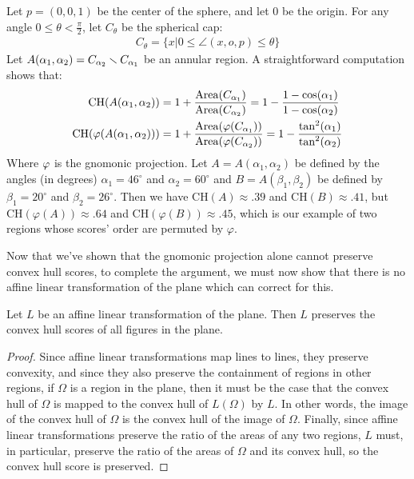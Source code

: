 \begin{example}
  Let $p = (0,0,1)$ be the center of the sphere, and let $0$ be the
  origin. For any angle $0\le \theta< \frac\pi2$, let $C_\theta$ be
  the spherical cap:
  \begin{align*}
    C_{\theta} = \{x|0\le\angle(x,o,p)\le \theta\}
  \end{align*}
  Let $A(\alpha_1,\alpha_2) = C_{\alpha_2}\smallsetminus C_{\alpha_1}$ be 
  an annular region. A straightforward computation shows that:
  \begin{align*}
    \mathrm{CH}(A(\alpha_1,\alpha_2)) &= 
    1+\frac{\mathrm{Area}(C_{\alpha_1})}{\mathrm{Area}(C_{\alpha_2})}
    =1- \frac{1-\cos(\alpha_1)}{1-\cos(\alpha_2)}\\
    \mathrm{CH}(\vphi(A(\alpha_1,\alpha_2))) &=
    1+\frac{\mathrm{Area}(\vphi(C_{\alpha_1}))}%
    {\mathrm{Area}(\vphi(C_{\alpha_2}))}
      =1- \frac{\tan^2(\alpha_1)}{\tan^2(\alpha_2)}
  \end{align*}
  Where $\varphi$ is the gnomonic projection. 
  Let $A=A(\alpha_1,\alpha_2)$ be defined by the angles 
  (in degrees) $\alpha_1=46^\circ$ and
  $\alpha_2=60^\circ$ and $B=A(\beta_1,\beta_2)$ be defined by 
  $\beta_1=20^\circ$ and $\beta_2=26^\circ$. 
  Then we have $\mathrm{CH}(A)\approx .39$ and
  $\mathrm{CH}(B)\approx .41$, but $\mathrm{CH}(\varphi(A))\approx .64$
  and $\mathrm{CH}(\varphi(B))\approx .45$, which is our example of two
  regions whose scores' order are permuted by $\varphi$.
\end{example}
Now that we've shown that the gnomonic projection alone cannot
preserve convex hull scores, to complete the argument, we must now
show that there is no affine linear transformation of the plane which
can correct for this.

\begin{lemma}\label{lem:noafflin}
  Let $L$ be an affine linear transformation of the plane.  Then $L$ preserves the convex hull scores of all figures in the plane.

\end{lemma}
\begin{proof}
  Since affine linear transformations map lines to lines, they preserve
  convexity, and since they also preserve the containment of regions in
  other regions, if $\Omega$ is a region in the plane, then it must be
  the case that the convex hull of $\Omega$ is mapped to the convex hull
  of $L(\Omega)$ by $L$.  In other words, the image of the convex hull
  of $\Omega$ is the convex hull of the image of $\Omega$.  Finally,
  since affine linear transformations preserve the ratio of the areas of
  any two regions, $L$ must, in particular, preserve the ratio of the
  areas of $\Omega$ and its convex hull, so the convex hull score is
  preserved.
\end{proof}

